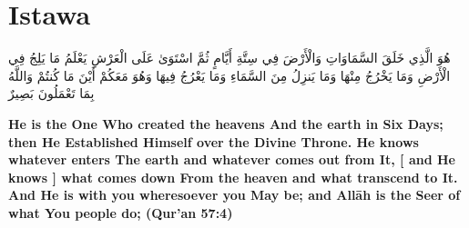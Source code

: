 \chapter{Istawa}
\begin{center}
    {\Huge    
        \begin{Arabic}
            هُوَ الَّذِي خَلَقَ السَّمَاوَاتِ وَالْأَرْضَ فِي سِتَّةِ أَيَّامٍ ثُمَّ اسْتَوَىٰ عَلَى الْعَرْشِ  يَعْلَمُ مَا يَلِجُ فِي الْأَرْضِ وَمَا يَخْرُجُ مِنْهَا وَمَا يَنزِلُ مِنَ السَّمَاءِ وَمَا يَعْرُجُ فِيهَا  وَهُوَ مَعَكُمْ أَيْنَ مَا كُنتُمْ  وَاللَّهُ بِمَا تَعْمَلُونَ بَصِيرٌ
        \end{Arabic}
    }
\end{center}
\vspace*{\fill}
\vspace{3cm}
\begin{center}
    \large \textbf{He is the One Who created the heavens And the earth in Six Days; then He Established Himself over the Divine Throne. He knows whatever enters The earth and whatever comes out from It, [ and He knows ] what comes down From the heaven and what transcend to It. And He is with you wheresoever you May be; and Allāh is the Seer of what You people do; (Qur'an 57:4)}
\end{center}
